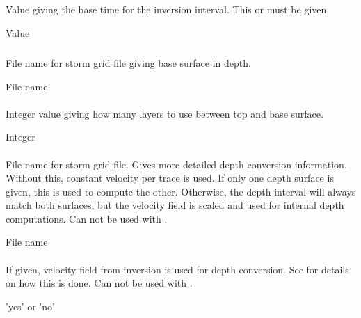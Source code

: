 \subparagraph{} 
\slist
   \item \Description Value giving the base time for the inversion interval. This or  must be given.
   \item \Argument Value
   \item \Default
\elist

\subparagraph{} 
\slist
   \item \Description File name for storm grid file giving base surface in depth.
   \item \Argument File name
   \item \Default
\elist


\paragraph{} 
 \slist
   \item \Description Integer value giving how many layers to use between top and base surface.
   \item \Argument Integer
   \item \Default
 \elist

\paragraph{} 
 \slist
   \item \Description File name for storm grid file. Gives more detailed depth conversion information. Without this, constant velocity per trace is used. If only one depth surface is given, this is used to compute the other. Otherwise, the depth interval will always match both surfaces, but the velocity field is scaled and used for internal depth computations. Can not be used with .
   \item \Argument File name
   \item \Default
 \elist

\paragraph{} 
 \slist
   \item \Description If given, velocity field from inversion is used for depth conversion. See  for details on how this is done. Can not be used with .
   \item \Argument 'yes' or 'no'
   \item \Default
 \elist

